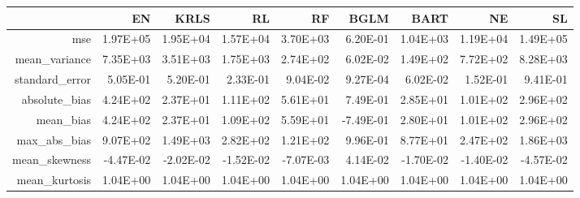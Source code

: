 \begin{table}[ht]
\centering
\begin{tabular}{rrrrrrrrr}
  \hline
 & EN & KRLS & RL & RF & BGLM & BART & NE & SL \\ 
  \hline
mse & 1.97E+05 & 1.95E+04 & 1.57E+04 & 3.70E+03 & 6.20E-01 & 1.04E+03 & 1.19E+04 & 1.49E+05 \\ 
  mean\_variance & 7.35E+03 & 3.51E+03 & 1.75E+03 & 2.74E+02 & 6.02E-02 & 1.49E+02 & 7.72E+02 & 8.28E+03 \\ 
  standard\_error & 5.05E-01 & 5.20E-01 & 2.33E-01 & 9.04E-02 & 9.27E-04 & 6.02E-02 & 1.52E-01 & 9.41E-01 \\ 
  absolute\_bias & 4.24E+02 & 2.37E+01 & 1.11E+02 & 5.61E+01 & 7.49E-01 & 2.85E+01 & 1.01E+02 & 2.96E+02 \\ 
  mean\_bias & 4.24E+02 & 2.37E+01 & 1.09E+02 & 5.59E+01 & -7.49E-01 & 2.80E+01 & 1.01E+02 & 2.96E+02 \\ 
  max\_abs\_bias & 9.07E+02 & 1.49E+03 & 2.82E+02 & 1.21E+02 & 9.96E-01 & 8.77E+01 & 2.47E+02 & 1.86E+03 \\ 
  mean\_skewness & -4.47E-02 & -2.02E-02 & -1.52E-02 & -7.07E-03 & 4.14E-02 & -1.70E-02 & -1.40E-02 & -4.57E-02 \\ 
  mean\_kurtosis & 1.04E+00 & 1.04E+00 & 1.04E+00 & 1.04E+00 & 1.04E+00 & 1.04E+00 & 1.04E+00 & 1.04E+00 \\ 
   \hline
\end{tabular}
\end{table}
